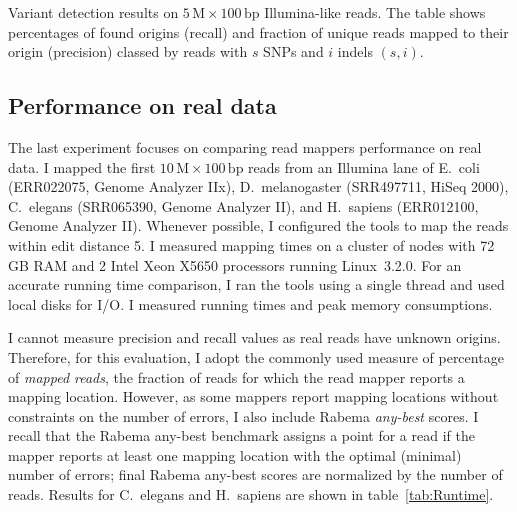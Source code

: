 \begin{table*}[tH!]
  \caption[Masai variant detection results]
  {
  \label{tab:Variant}
    Variant detection results on $5\,\text{M}\times 100\,\text{bp}$ Illumina-like reads.
    The table shows percentages of found origins (recall) and fraction of unique reads mapped to their origin (precision) classed by reads with $s$ SNPs and $i$ indels $(s,i)$.
  }
  \vspace{-3mm}
  \center
  \sffamily
  \resizebox{0.8\textwidth}{!}
  {
	\renewcommand{\tabcolsep}{0.8ex}
	
  }
\end{table*}

\subsection{Performance on real data}
\label{masai:evaluation:performance}

The last experiment focuses on comparing read mappers performance on real data.
I mapped the first $10\,\text{M}\times 100\,\text{bp}$ reads from an Illumina lane of E.~coli (ERR022075, Genome Analyzer IIx), D.~melanogaster (SRR497711, HiSeq 2000), C.~elegans (SRR065390, Genome Analyzer II), and H.~sapiens (ERR012100, Genome Analyzer II).
Whenever possible, I configured the tools to map the reads within edit distance 5.
I measured mapping times on a cluster of nodes with 72\,GB RAM and 2 Intel Xeon X5650 processors running Linux~3.2.0.
For an accurate running time comparison, I ran the tools using a single thread and used local disks for I/O.
I measured running times and peak memory consumptions.

I cannot measure precision and recall values as real reads have unknown origins.
Therefore, for this evaluation, I adopt the commonly used measure of percentage of \emph{mapped reads}, \ie the fraction of reads for which the read mapper reports a mapping location.
However, as some mappers report mapping locations without constraints on the number of errors, I also include Rabema \emph{any-best} scores.
I recall that the Rabema any-best benchmark assigns a point for a read if the mapper reports at least one mapping location with the optimal (\ie minimal) number of errors;
final Rabema any-best scores are normalized by the number of reads.
Results for C.~elegans and H.~sapiens are shown in table~\ref{tab:Runtime}.

